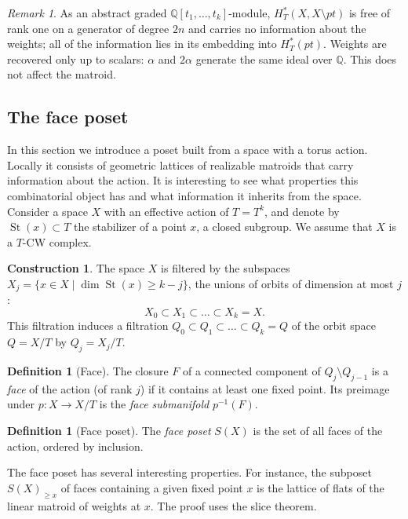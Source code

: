 \documentclass[11pt,a4paper]{article}
\numberwithin{equation}{section}
\theoremstyle{plain}
\theoremstyle{definition}
\newtheorem{definition}[theorem]{Definition}
\newtheorem{construction}[theorem]{Construction}
\theoremstyle{remark}
\newtheorem{remark}[theorem]{Remark}
\newcommand{\Q}{\mathbb{Q}}
\newcommand{\HT}{H^{*}_{T}}
\DeclareMathOperator{\St}{St}
\begin{document}
\begin{remark}
As an abstract graded $\Q[t_1,\dots,t_k]$-module, $\HT(X,X\setminus pt)$ is free of rank one on a generator of degree $2n$ and carries no information about the weights; all of the information lies in its embedding into $\HT(pt)$. Weights are recovered only up to scalars: $\alpha$ and $2\alpha$ generate the same ideal over $\Q$. This does not affect the matroid.
\end{remark}

\subsection{The face poset}\label{sec:faces}

In this section we introduce a poset built from a space with a torus action. Locally it consists of geometric lattices of realizable matroids that carry information about the action. It is interesting to see what properties this combinatorial object has and what information it inherits from the space. Consider a space $X$ with an effective action of $T=T^k$, and denote by $\St(x)\subset T$ the stabilizer of a point $x$, a closed subgroup. We assume that $X$ is a $T$-CW complex.

\begin{construction}
The space $X$ is filtered by the subspaces $X_j=\{x\in X\mid\dim\St(x)\geqslant k-j\}$, the unions of orbits of dimension at most $j$:
\[
X_0\subset X_1\subset\dots\subset X_k=X.
\]
This filtration induces a filtration $Q_0\subset Q_1\subset\dots\subset Q_k=Q$ of the orbit space $Q=X/T$ by $Q_j=X_j/T$.
\end{construction}

\begin{definition}[Face]
The closure $F$ of a connected component of $Q_j\setminus Q_{j-1}$ is a \emph{face} of the action (of rank $j$) if it contains at least one fixed point. Its preimage under $p\colon X\to X/T$ is the \emph{face submanifold} $p^{-1}(F)$.
\end{definition}

\begin{definition}[Face poset]
The \emph{face poset} $S(X)$ is the set of all faces of the action, ordered by inclusion.
\end{definition}

The face poset has several interesting properties. For instance, the subposet $S(X)_{\geqslant x}$ of faces containing a given fixed point $x$ is the lattice of flats of the linear matroid of weights at $x$. The proof uses the slice theorem.
\end{document}
